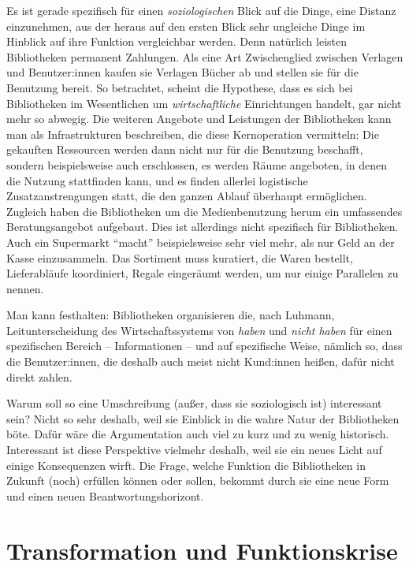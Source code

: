 \documentclass[a4paper,
fontsize=11pt,
oneside,
numbers=noperiodatend,
parskip=half-,
bibliography=totoc,
final
]{scrartcl}
\begin{document}
Es ist gerade spezifisch für einen \emph{soziologischen} Blick auf die
Dinge, eine Distanz einzunehmen, aus der heraus auf den ersten Blick
sehr ungleiche Dinge im Hinblick auf ihre Funktion vergleichbar werden.
Denn natürlich leisten Bibliotheken permanent Zahlungen. Als eine Art
Zwischenglied zwischen Verlagen und Benutzer:innen kaufen sie Verlagen
Bücher ab und stellen sie für die Benutzung bereit. So betrachtet,
scheint die Hypothese, dass es sich bei Bibliotheken im Wesentlichen um
\emph{wirtschaftliche} Einrichtungen handelt, gar nicht mehr so abwegig.
Die weiteren Angebote und Leistungen der Bibliotheken kann man als
Infrastrukturen beschreiben, die diese Kernoperation vermitteln: Die
gekauften Ressourcen werden dann nicht nur für die Benutzung beschafft,
sondern beispielsweise auch erschlossen, es werden Räume angeboten, in
denen die Nutzung stattfinden kann, und es finden allerlei logistische
Zusatzanstrengungen statt, die den ganzen Ablauf überhaupt ermöglichen.
Zugleich haben die Bibliotheken um die Medienbenutzung herum ein
umfassendes Beratungsangebot aufgebaut. Dies ist allerdings nicht
spezifisch für Bibliotheken. Auch ein Supermarkt \enquote{macht}
beispielsweise sehr viel mehr, als nur Geld an der Kasse einzusammeln.
Das Sortiment muss kuratiert, die Waren bestellt, Lieferabläufe
koordiniert, Regale eingeräumt werden, um nur einige Parallelen zu
nennen.

Man kann festhalten: Bibliotheken organisieren die, nach Luhmann,
Leitunterscheidung des Wirtschaftssystems von \emph{haben} und
\emph{nicht haben} für einen spezifischen Bereich -- Informationen --
und auf spezifische Weise, nämlich so, dass die Benutzer:innen, die
deshalb auch meist nicht Kund:innen heißen, dafür nicht direkt zahlen.

Warum soll so eine Umschreibung (außer, dass sie soziologisch ist)
interessant sein? Nicht so sehr deshalb, weil sie Einblick in die wahre
Natur der Bibliotheken böte. Dafür wäre die Argumentation auch viel zu
kurz und zu wenig historisch. Interessant ist diese Perspektive vielmehr
deshalb, weil sie ein neues Licht auf einige Konsequenzen wirft. Die
Frage, welche Funktion die Bibliotheken in Zukunft (noch) erfüllen
können oder sollen, bekommt durch sie eine neue Form und einen neuen
Beantwortungshorizont.

\pagebreak
\hypertarget{transformation-und-funktionskrise}{%
\section{Transformation und
Funktionskrise}\label{transformation-und-funktionskrise}}
\end{document}
